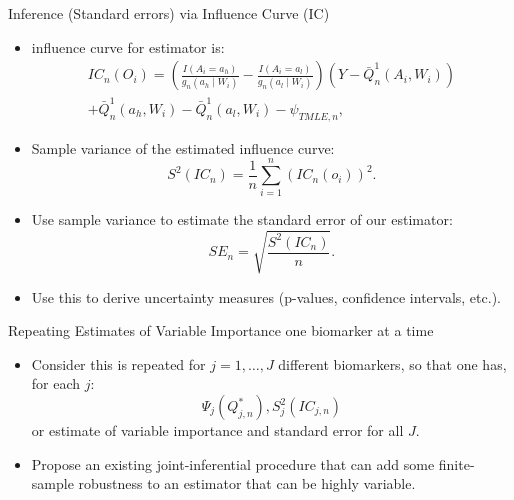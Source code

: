 \documentclass[12pt,t,handout]{beamer}
\begin{document}
\begin{frame}[c]{Inference (Standard errors) via Influence Curve (IC)}

\begin{center}
\begin{itemize}
\item influence curve for estimator is:
\begin{multline*}
IC_n(O_i)=\left (\frac{I(A_i=a_h)}{g_n(a_h\mid W_i)}-\frac{I(A_i=a_l)}{g_n(a_l\mid W_i)}\right)(Y-\bar{Q}^1_n(A_i,W_i))\\
+\bar{Q}^1_n(a_h,W_i)-\bar{Q}^1_n(a_l,W_i)-\psi_{TMLE,n},
\end{multline*}
\item Sample variance of the estimated influence curve:
\[\textstyle S^2(IC_n)=\frac{1}{n}\sum_{i=1}^n\left(IC_n(o_i)\right)^2.\]
\item Use sample variance to estimate the standard error of our estimator:
\[SE_n=\sqrt{\frac{S^2(IC_n)}{n}}.\]
\item Use this to derive uncertainty measures (p-values, confidence intervals, etc.).
\end{itemize}
\end{center}


\end{frame}



\begin{frame}[c]{Repeating Estimates of Variable Importance one biomarker at a
  time}

\Large{
\begin{itemize}
\item Consider this is repeated for $j=1,\ldots,J$  different biomarkers, so that one has, for each $j$: 
$$\Psi_j(Q_{j,n}^{*}),S_j^2(IC_{j,n})$$
or estimate of variable importance and standard error for all $J$.
\item Propose an existing joint-inferential procedure that can add some finite-sample robustness to an estimator that can be highly variable.
\end{itemize}
}


\end{frame}
\end{document}
